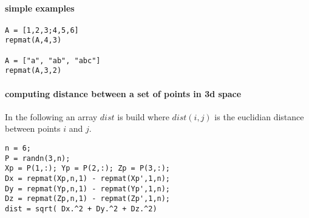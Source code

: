 \begin{examples}

\paragraph{simple examples}
\begin{Verbatim}
A = [1,2,3;4,5,6]
repmat(A,4,3)

A = ["a", "ab", "abc"]
repmat(A,3,2)
\end{Verbatim}

\paragraph{computing distance between a set of points in 3d space}

In the following an array $dist$ is build where $dist(i,j)$ is the 
euclidian distance between points $i$ and $j$.
\begin{Verbatim}
n = 6;
P = randn(3,n);
Xp = P(1,:); Yp = P(2,:); Zp = P(3,:);
Dx = repmat(Xp,n,1) - repmat(Xp',1,n);
Dy = repmat(Yp,n,1) - repmat(Yp',1,n);
Dz = repmat(Zp,n,1) - repmat(Zp',1,n);
dist = sqrt( Dx.^2 + Dy.^2 + Dz.^2)
\end{Verbatim}

\end{examples}


\begin{manseealso}
\end{manseealso}


